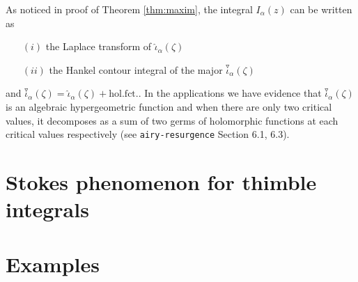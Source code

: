 \documentclass[11pt,a4paper,twoside,leqno,noamsfonts]{amsart}
\numberwithin{equation}{section}
\begin{document}
As noticed in proof of Theorem \ref{thm:maxim}, the integral $I_{\alpha}(z)$ can be written as 
\begin{enumerate}
\item[$(i)$] the Laplace transform of $\hat{\iota}_{\alpha}(\zeta)$
\item[$(ii)$] the Hankel contour integral of the major $\overset{\triangledown}{\iota}_\alpha(\zeta)$
\end{enumerate}
and $\overset{\triangledown}{\iota}_\alpha(\zeta)=\hat{
\iota}_{\alpha}(\zeta)+\text{hol.fct.}$. In the applications we have evidence that $\overset{\triangledown}{\iota}_\alpha(\zeta)$ is an algebraic hypergeometric function and when there are only two critical values, it decomposes as a sum of two germs of holomorphic functions at each critical values respectively (see {\tt airy-resurgence} Section 6.1, 6.3). 

\section{Stokes phenomenon for thimble integrals}

\section{Examples}   


 
\end{document}
